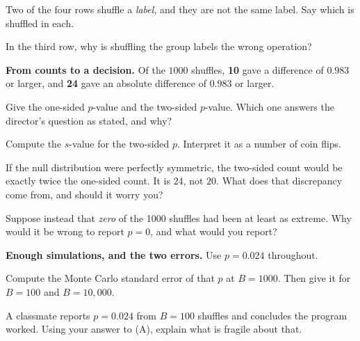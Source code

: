 \documentclass[11pt]{article}
\newcommand{\answerspace}[1]{\vspace{#1}}
\begin{document}
\begin{questions}
\begin{parts}
\item Two of the four rows shuffle a \emph{label}, and they are not the same label. Say which is
shuffled in each.
\answerspace{4em}

\item In the third row, why is shuffling the group labels the wrong operation?
\answerspace{4em}
\end{parts}

\item \textbf{From counts to a decision.} Of the $1000$ shuffles, \textbf{10} gave a difference
of $0.983$ or larger, and \textbf{24} gave an absolute difference of $0.983$ or larger.

\begin{parts}
\item Give the one-sided $p$-value and the two-sided $p$-value. Which one answers the director's
question as stated, and why?
\answerspace{4em}

\item Compute the $s$-value for the two-sided $p$. Interpret it as a number of coin flips.
\answerspace{3.5em}

\item If the null distribution were perfectly symmetric, the two-sided count would be exactly
twice the one-sided count. It is $24$, not $20$. What does that discrepancy come from, and should
it worry you?
\answerspace{4.5em}

\item Suppose instead that \emph{zero} of the 1000 shuffles had been at least as extreme. Why
would it be wrong to report $p = 0$, and what would you report?
\answerspace{4em}
\end{parts}

\item \textbf{Enough simulations, and the two errors.} Use $p = 0.024$ throughout.

\begin{parts}
\item Compute the Monte Carlo standard error of that $p$ at $B = 1000$. Then give it for
$B = 100$ and $B = 10{,}000$.
\answerspace{4.5em}

\item A classmate reports $p = 0.024$ from $B = 100$ shuffles and concludes the program worked.
Using your answer to (A), explain what is fragile about that.
\answerspace{4em}


\end{parts}
\end{questions}
\end{document}
